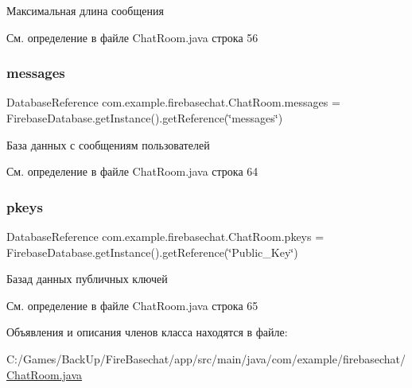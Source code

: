 Максимальная длина сообщения 



См. определение в файле Chat\+Room.\+java строка 56

\mbox{\label{classcom_1_1example_1_1firebasechat_1_1_chat_room_adb882b49c6dbcbe1508d090eb2507505}} 
\subsubsection{\texorpdfstring{messages}{messages}}
{\footnotesize\ttfamily Database\+Reference com.\+example.\+firebasechat.\+Chat\+Room.\+messages = Firebase\+Database.\+get\+Instance().get\+Reference(\char`\"{}messages\char`\"{})}



База данных с сообщениям пользователей 



См. определение в файле Chat\+Room.\+java строка 64

\mbox{\label{classcom_1_1example_1_1firebasechat_1_1_chat_room_ad3a0dbe421eb87403be4582e54eac253}} 
\subsubsection{\texorpdfstring{pkeys}{pkeys}}
{\footnotesize\ttfamily Database\+Reference com.\+example.\+firebasechat.\+Chat\+Room.\+pkeys = Firebase\+Database.\+get\+Instance().get\+Reference(\char`\"{}Public\+\_\+\+Key\char`\"{})}



Базад данных публичных ключей 



См. определение в файле Chat\+Room.\+java строка 65



Объявления и описания членов класса находятся в файле\+:\begin{DoxyCompactItemize}
\item 
C\+:/\+Games/\+Back\+Up/\+Fire\+Basechat/app/src/main/java/com/example/firebasechat/\mbox{\hyperlink{_chat_room_8java}{Chat\+Room.\+java}}\end{DoxyCompactItemize}
